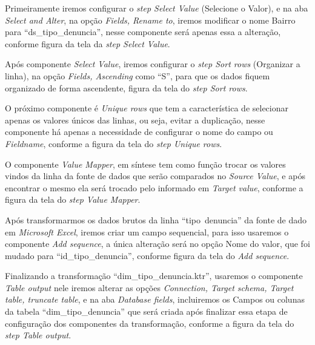 Primeiramente iremos configurar o \textit{step Select Value} (Selecione o Valor), e na aba \textit{Select and Alter}, na op\c{c}\~{a}o \textit{Fields, Rename to}, iremos modificar o nome Bairro para ``ds\_tipo\_denuncia'', nesse componente ser\'{a} apenas essa a altera\c{c}\~{a}o, conforme figura da tela da \textit{step Select Value}.

Ap\'os  componente \textit{Select Value}, iremos configurar o \textit{step Sort rows} (Organizar a linha), na op\c{c}\~{a}o \textit{Fields, Ascending} como ``S'', para que os dados fiquem organizado de forma ascendente, figura da tela do \textit{step Sort rows}.

O pr\'oximo componente \'{e} \textit{Unique rows} que tem a caracter\'{i}stica de selecionar apenas os valores únicos das linhas, ou seja, evitar a duplica\c{c}\~{a}o, nesse componente h\'{a} apenas a necessidade de configurar o nome do campo ou \textit{Fieldname}, conforme a figura da tela do \textit{step Unique rows}.

O componente \textit{Value Mapper}, em s\'{i}ntese tem como fun\c{c}\~{a}o trocar os valores vindos da linha da fonte de dados que ser\~{a}o comparados no \textit{Source Value}, e ap\'os encontrar o mesmo ela ser\'{a} trocado pelo informado em \textit{Target value}, conforme a figura da tela do \textit{step Value Mapper}.

Ap\'os transformarmos os dados brutos da linha ``tipo\ denuncia'' da fonte de dado em \textit{Microsoft Excel}, iremos criar um campo sequencial, para isso usaremos o componente \textit{Add sequence}, a única altera\c{c}\~{a}o ser\'{a} no op\c{c}\~{a}o Nome do valor, que foi mudado para ``id\_tipo\_denuncia'', conforme figura da tela do \textit{Add sequence}.

Finalizando a transforma\c{c}\~{a}o ``dim\_tipo\_denuncia.ktr'', usaremos o componente \textit{Table output} nele iremos alterar as op\c{c}\~{o}es \textit{Connection, Target schema, Target table, truncate table}, e na aba \textit{Database fields}, incluiremos os Campos ou colunas da tabela ``dim\_tipo\_denuncia'' que ser\'{a} criada ap\'os finalizar essa etapa de configura\c{c}\~{a}o dos componentes da transforma\c{c}\~{a}o, conforme a figura da tela do \textit{step Table output}.

